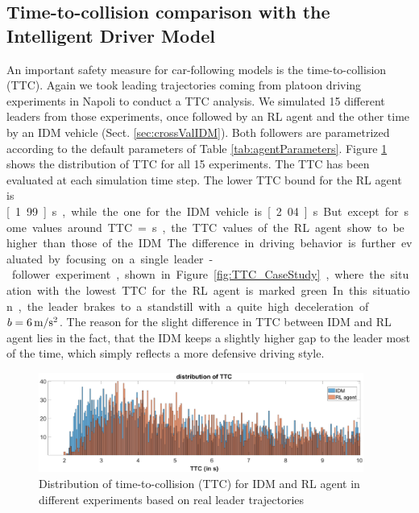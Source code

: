 \documentclass[review]{elsarticle}
\providecommand{\3}{{\ss}}
\begin{document}
\subsection{Time-to-collision comparison with the Intelligent Driver Model}

An important safety measure for car-following models is the
time-to-collision (TTC). Again we took leading trajectories coming
from platoon driving experiments in Napoli to conduct a TTC
analysis. We simulated 15 different leaders from those experiments,
once followed by an RL agent and the other time by an IDM vehicle (Sect. \ref{sec:crossValIDM}). Both
followers are parametrized according to the default parameters of Table
\ref{tab:agentParameters}. Figure \ref{fig:DistributionTTC} shows the
distribution of TTC for all 15 experiments. The TTC has been evaluated
at each simulation time step. The lower TTC bound for the RL agent is
\unit[1.99]{s}, while the one for the IDM vehicle is
\unit[2.04]{s}. But except for some values around TTC = \unit[2]{s}, the TTC values of the RL agent show to be higher than those of the IDM.

The difference in driving behavior is further
evaluated by focusing on a single leader-follower experiment, shown in
Figure \ref{fig:TTC_CaseStudy}, where the situation with the lowest TTC for the RL agent is marked green. In this situation, the leader brakes to a standstill with a 
quite high deceleration of $b = \unit[6]{m/s^2}$. The reason for the slight
difference in TTC between IDM and RL agent lies in the fact, that the
IDM keeps a slightly higher gap to the leader most of the time,
which simply reflects a more defensive driving style. 

\begin{figure}	
	\centering
	\includegraphics[width=0.95\textwidth]{images/TTC}
	\caption{Distribution of time-to-collision (TTC) for IDM and RL agent in different experiments based on real leader trajectories}
	\label{fig:DistributionTTC}
\end{figure}
\end{document}
